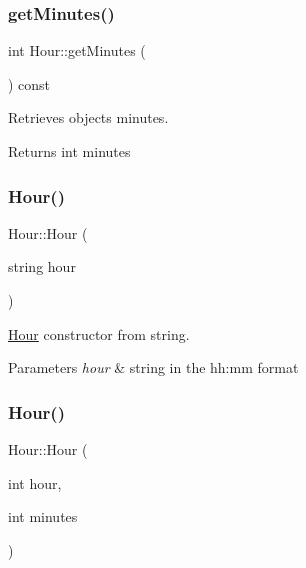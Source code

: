 \subsubsection{\texorpdfstring{get\+Minutes()}{getMinutes()}}
{\footnotesize\ttfamily int Hour\+::get\+Minutes (\begin{DoxyParamCaption}{ }\end{DoxyParamCaption}) const}



Retrieves object\textquotesingle{}s minutes. 

\begin{DoxyReturn}{Returns}
int minutes 
\end{DoxyReturn}
\mbox{\label{group___hour_ga77024d0dee349bc56162428af7c60f8c}} 
\subsubsection{\texorpdfstring{Hour()}{Hour()}\hspace{0.1cm}{\footnotesize\ttfamily [1/2]}}
{\footnotesize\ttfamily Hour\+::\+Hour (\begin{DoxyParamCaption}\item[{string}]{hour }\end{DoxyParamCaption})}



\hyperlink{class_hour}{Hour} constructor from string. 


\begin{DoxyParams}{Parameters}
{\em hour} & string in the hh\+:mm format \\
\hline
\end{DoxyParams}
\mbox{\label{group___hour_gaedd062589c21da403d9490a9706c3005}} 
\subsubsection{\texorpdfstring{Hour()}{Hour()}\hspace{0.1cm}{\footnotesize\ttfamily [2/2]}}
{\footnotesize\ttfamily Hour\+::\+Hour (\begin{DoxyParamCaption}\item[{int}]{hour,  }\item[{int}]{minutes }\end{DoxyParamCaption})}



